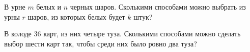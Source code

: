 \begin{problems}





\item В урне $m$ белых и $n$ черных шаров. Сколькими способами можно выбрать из урны $r$ шаров, из которых белых будет $k$ штук?


\item В колоде $36$ карт, из них четыре туза. Сколькими
способами можно сделать выбор шести карт так, чтобы среди них
было ровно два туза?
\end{problems}
